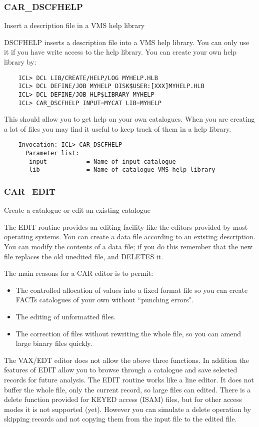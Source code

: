 \subsubsection{CAR\_DSCFHELP}

Insert a description file in a VMS help library

DSCFHELP inserts a description file into a VMS help library.
You can only use it if you have write access to the help library.
You can create your own help library by:
\begin{verbatim}
    ICL> DCL LIB/CREATE/HELP/LOG MYHELP.HLB
    ICL> DCL DEFINE/JOB MYHELP DISK$USER:[XXX]MYHELP.HLB
    ICL> DCL DEFINE/JOB HLP$LIBRARY MYHELP
    ICL> CAR_DSCFHELP INPUT=MYCAT LIB=MYHELP
\end{verbatim}
This should allow you to get help on your own catalogues.
When you are creating a lot of files you may find it useful to
keep track of them in a help library.
\begin{verbatim}
    Invocation: ICL> CAR_DSCFHELP
      Parameter list:
       input           = Name of input catalogue
       lib             = Name of catalogue VMS help library
\end{verbatim}

\subsubsection{CAR\_EDIT}

Create a catalogue or edit an existing catalogue

The EDIT routine provides an editing facility like the editors
provided by most operating systems.
You can create a data file according to an existing description.
You can modify the contents of a data file; if you do this remember
that the new file replaces the old unedited file, and DELETES it.

The main reasons for a CAR editor is to permit:
\begin{itemize}
\item The controlled allocation of values into a fixed format file so you
can create FACTs catalogues of your own without ``punching errors".
\item The editing of unformatted files.
\item The correction of files without rewriting the whole file, so you
can amend large binary files quickly.
\end{itemize}
The VAX/EDT editor does not allow the above three functions.
In addition the features of EDIT allow you to browse through a
catalogue and save selected records for future analysis.
The EDIT routine works like a line editor.
It does not buffer the whole file, only the current record, so large
files can edited.
There is a delete function provided for KEYED access (ISAM) files,
but for other access modes it is not supported (yet).
However you can simulate a delete operation by skipping records and not
copying them from the input file to the edited file.

